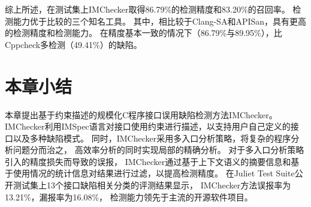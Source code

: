 综上所述，在测试集上IMChecker取得86.79\%的检测精度和83.20\%的召回率。
检测能力优于比较的三个知名工具。
其中，相比较于Clang-SA和APISan，具有更高的检测精度和检测能力。
在精度基本一致的情况下（86.79\%与89.95\%），比Cppcheck多检测（49.41\%）的缺陷。


\section{本章小结}
\label{sec:3.5}
本章提出基于约束描述的规模化C程序接口误用缺陷检测方法IMChecker。
IMChecker利用IMSpec语言对接口使用约束进行描述，以支持用户自己定义的接口以及多种缺陷模式。
同时，IMChecker采用多入口分析策略，将复杂的程序分析问题分而治之，
高效率分析的同时实现局部的精确分析。
对于多入口分析策略引入的精度损失而导致的误报，
IMChecker通过基于上下文语义的摘要信息和基于使用情况的统计信息对结果进行过滤，以提高检测精度。
在Juliet Test Suite公开测试集上13个接口缺陷相关分类的评测结果显示，
IMChecker方法误报率为13.21\%，漏报率为16.08\%，
检测能力领先于主流的开源软件项目。
